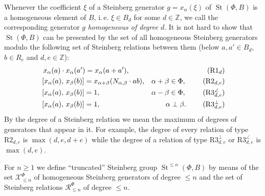 \documentclass[oneside, 8pt]{amsart}
\theoremstyle{remark}
\theoremstyle{definition}
\DeclareMathOperator{\St}{St}
\numberwithin{equation}{section}
\begin{document}
Whenever the coefficient $\xi$ of a Steinberg generator $g = x_\alpha(\xi)$ of $\St(\Phi, B)$ is a homogeneous element of $B$, i.\,e. $\xi \in B_d$ for some $d \in \mathbb{Z}$,
 we call the corresponding generator $g$ {\it homogeneous of degree $d$}.
It is not hard to show that $\St(\Phi, B)$ can be presented by the set of all homogeneous Steinberg generators modulo the following set of Steinberg relations
 between them (below $a, a' \in B_d$, $b\in R_e$ and $d,e \in \mathbb{Z}$): 
\begin{align}
&\,\,x_{\alpha}(a)\cdot x_{\alpha}(a') =  x_{\alpha}(a+a'),                        & \tag{R$1_d$} \\
&\,[x_{\alpha}(a),\,x_{\beta}(b)]= x_{\alpha+\beta}(N_{\alpha, \beta} \cdot ab),   & \alpha + \beta \in \Phi,\ \tag{R$2_{d,e}$} \\
&\,[x_{\alpha}(a),\,x_{\beta}(b)]= 1,                                              & \alpha - \beta \in \Phi,\ \tag{R$3^\angle_{d,e}$} \\
&\,[x_{\alpha}(a),\,x_{\beta}(b)]= 1,                                              & \alpha \perp \beta.\ \tag{R$3^\bot_{d,e}$}
\end{align}
By the degree of a Steinberg relation we mean the maximum of degrees of generators that appear in it.
For example, the degree of every relation of type $\text{R2}_{d,e}$ is $\max(d,e,d+e)$ 
 while the degree of a relation of type $\text{R3}^\bot_{d,e}$ or $\text{R3}^\angle_{d,e}$ is $\max(d,e)$.

For $n\geq 1$ we define ``truncated'' Steinberg group $\St^{\leq n}(\Phi, B)$ by means of the set $\mathcal{X}_{\leq n}^\Phi$ of homogeneous Steinberg generators of degree $\leq n$ and the set of Steinberg relations $\mathcal{R}_{\leq n}^\Phi$ of degree $\leq n$.
\end{document}
